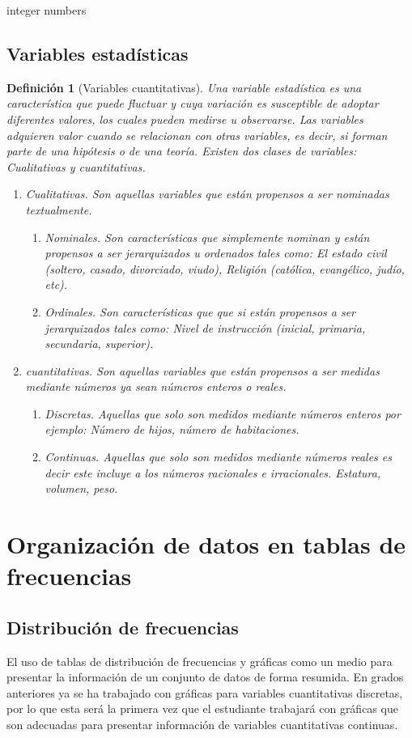 \documentclass[a4paper]{report}
\newtheorem{defn}[thm]{Definición}
\begin{document}
integer numbers


\subsection{Variables estadísticas}

\begin{defn}[Variables cuantitativas]
  Una variable estadística es una característica que puede fluctuar y cuya variación es susceptible de adoptar diferentes valores, los cuales pueden medirse u observarse. Las variables adquieren valor cuando se relacionan con otras variables, es decir, si forman parte de una hipótesis o de una teoría. Existen dos clases de variables: Cualitativas y cuantitativas.
  \begin{enumerate}
    \item  Cualitativas. Son aquellas variables que están propensos a ser nominadas textualmente.
    \begin{enumerate}
      \item  Nominales. Son características que simplemente nominan y están propensos a ser jerarquizados u ordenados tales como: El estado   civil (soltero, casado, divorciado, viudo), Religión (católica, evangélico, judío, etc).
      \item  Ordinales. Son características que que si están propensos a ser jerarquizados tales como: Nivel de instrucción (inicial, primaria, secundaria, superior).
    \end{enumerate}
    \item  cuantitativas. Son aquellas variables que están propensos a ser medidas mediante números ya sean números enteros o reales.
    \begin{enumerate}
      \item  Discretas. Aquellas que solo son medidos mediante números enteros por ejemplo: Número de hijos, número de habitaciones.
      \item  Continuas. Aquellas que solo son medidos mediante números reales es decir este incluye a los números racionales e irracionales. Estatura, volumen, peso.
    \end{enumerate}
  \end{enumerate}
\end{defn}


\section{Organización de datos en tablas de frecuencias}
\subsection{Distribución de frecuencias}
El uso de tablas de distribución de frecuencias y gráficas como un medio para presentar la información
de un conjunto de datos de forma resumida. En grados anteriores ya se ha trabajado con gráficas para
variables cuantitativas discretas, por lo que esta será la primera vez que el estudiante trabajará con
gráficas que son adecuadas para presentar información de variables cuantitativas continuas.
\end{document}
